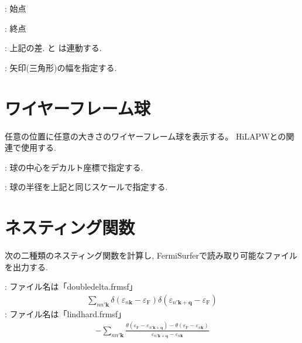 \documentclass[letterpaper,10pt,dvipdfmx,openany]{sphinxmanual}
\begin{document}
\sphinxAtStartPar
{} : 始点

\sphinxAtStartPar
{} : 終点

\sphinxAtStartPar
{} : 上記の差.  と  は連動する.

\sphinxAtStartPar
{} : 矢印(三角形)の幅を指定する.


\section{ワイヤーフレーム球}
\label{\detokenize{ops:id20}}
\sphinxAtStartPar
任意の位置に任意の大きさのワイヤーフレーム球を表示する。
HiLAPWとの関連で使用する.

\sphinxAtStartPar
{} : 球の中心をデカルト座標で指定する.

\sphinxAtStartPar
{} : 球の半径を上記と同じスケールで指定する.


\section{ネスティング関数}
\label{\detokenize{ops:id21}}
\sphinxAtStartPar
次の二種類のネスティング関数を計算し, FermiSurferで読み取り可能なファイルを出力する.

\sphinxAtStartPar
{} : ファイル名は「doubledelta.frmsf」
\begin{equation*}
\begin{split}\sum_{n n' \textbf{k}} \delta(\varepsilon_{n \textbf{k}}-\varepsilon_\textrm{F})
\delta(\varepsilon_{n' \textbf{k}+\textbf{q}}-\varepsilon_\textrm{F})\end{split}
\end{equation*}
\sphinxAtStartPar
{} :  ファイル名は「lindhard.frmsf」
\begin{equation*}
\begin{split}-\sum_{n n' \textbf{k}} \frac{\theta(\varepsilon_\textrm{F} - \varepsilon_{n' \textbf{k}+\textbf{q}})
-\theta(\varepsilon_\textrm{F}-\varepsilon_{n \textbf{k}})}
{\varepsilon_{n' \textbf{k}+\textbf{q}} - \varepsilon_{n \textbf{k}}}\end{split}
\end{equation*}
\end{document}
